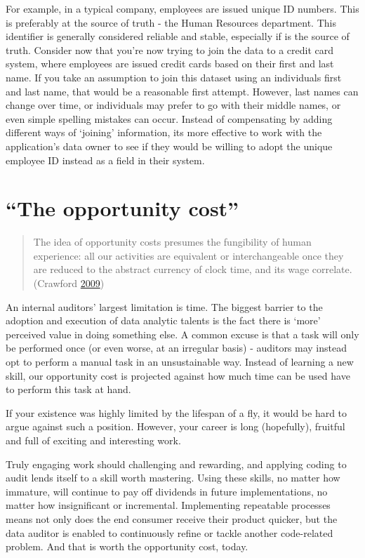 \documentclass[
]{book}
\begin{document}
For example, in a typical company, employees are issued unique ID numbers. This is preferably at the source of truth - the Human Resources department. This identifier is generally considered reliable and stable, especially if is the source of truth. Consider now that you're now trying to join the data to a credit card system, where employees are issued credit cards based on their first and last name. If you take an assumption to join this dataset using an individuals first and last name, that would be a reasonable first attempt. However, last names can change over time, or individuals may prefer to go with their middle names, or even simple spelling mistakes can occur. Instead of compensating by adding different ways of `joining' information, its more effective to work with the application's data owner to see if they would be willing to adopt the unique employee ID instead as a field in their system.

\hypertarget{the-opportunity-cost}{%
\section{``The opportunity cost''}\label{the-opportunity-cost}}

\begin{quote}
The idea of opportunity costs presumes the fungibility of human experience: all our activities are equivalent or interchangeable once they are reduced to the abstract currency of clock time, and its wage correlate. (Crawford \protect\hyperlink{ref-shop-class}{2009})
\end{quote}

An internal auditors' largest limitation is time. The biggest barrier to the adoption and execution of data analytic talents is the fact there is `more' perceived value in doing something else. A common excuse is that a task will only be performed once (or even worse, at an irregular basis) - auditors may instead opt to perform a manual task in an unsustainable way. Instead of learning a new skill, our opportunity cost is projected against how much time can be used have to perform this task at hand.

If your existence was highly limited by the lifespan of a fly, it would be hard to argue against such a position. However, your career is long (hopefully), fruitful and full of exciting and interesting work.

Truly engaging work should challenging and rewarding, and applying coding to audit lends itself to a skill worth mastering. Using these skills, no matter how immature, will continue to pay off dividends in future implementations, no matter how insignificant or incremental. Implementing repeatable processes means not only does the end consumer receive their product quicker, but the data auditor is enabled to continuously refine or tackle another code-related problem. And that is worth the opportunity cost, today.
\end{document}
